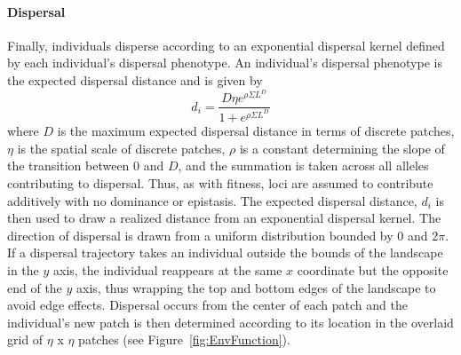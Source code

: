 \documentclass[12pt, oneside]{article}
\begin{document}
\paragraph{Dispersal}
Finally, individuals disperse according to an exponential dispersal kernel defined by each individual's dispersal phenotype. An individual's dispersal phenotype is the expected dispersal distance and is given by
\begin{equation}
d_{i} = \frac{D\eta e^{\rho\Sigma L^{D}}}{1+e^{\rho\Sigma L^{D}}} 
\end{equation}
where $D$ is the maximum expected dispersal distance in terms of discrete patches, $\eta$ is the spatial scale of discrete patches, $\rho$ is a constant determining the slope of the transition between $0$ and $D$, and the summation is taken across all alleles contributing to dispersal. Thus, as with fitness, loci are assumed to contribute additively with no dominance or epistasis. The expected dispersal distance, $d_{i}$ is then used to draw a realized distance from an exponential dispersal kernel. The direction of dispersal is drawn from a uniform distribution bounded by $0$ and $2\pi$. If a dispersal trajectory takes an individual outside the bounds of the landscape in the $y$ axis, the individual reappears at the same $x$ coordinate but the opposite end of the $y$ axis, thus wrapping the top and bottom edges of the landscape to avoid edge effects. Dispersal occurs from the center of each patch and the individual's new patch is then determined according to its location in the overlaid grid of $\eta$ x $\eta$ patches (see Figure~\ref{fig:EnvFunction}).




\newpage
\end{document}
